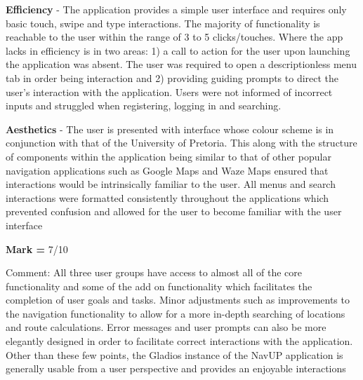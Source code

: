 \documentclass[english]{article}
\begin{document}
		\textbf{Efficiency} - The application provides a simple user interface and requires only basic touch, swipe and type interactions. The majority of functionality is reachable to the user within the range of 3 to 5 clicks/touches. Where the app lacks in efficiency is in two areas:  1) a call to action for the user upon launching the application was absent. The user was required to open a descriptionless menu tab in order being interaction and 2) providing guiding prompts to direct the user's interaction with the application. Users were not informed of incorrect inputs and struggled when registering, logging in and searching.\newline
		
		\textbf{Aesthetics} - The user is presented with interface whose colour scheme is in conjunction with that of the University of Pretoria. This along with the structure of components within the application being similar to that of other popular navigation applications such as Google Maps and Waze Maps ensured that interactions would be intrinsically familiar to the user. All menus and search interactions were formatted consistently throughout the applications which prevented confusion and allowed for the user to become familiar with the user interface \newline
		
	\textbf{Mark =} 7/10 \newline
	
		Comment:  All three user groups have access to almost all of the core functionality and some of the add on functionality which facilitates the completion of user goals and tasks. Minor adjustments such as improvements to the navigation functionality to allow for a more in-depth searching of locations and route calculations. Error messages and user prompts can also be more elegantly designed in order to facilitate correct interactions with the application. Other than these few points, the Gladios instance of the NavUP application is generally usable from a user perspective and provides an enjoyable interactions 
		
\end{document}
